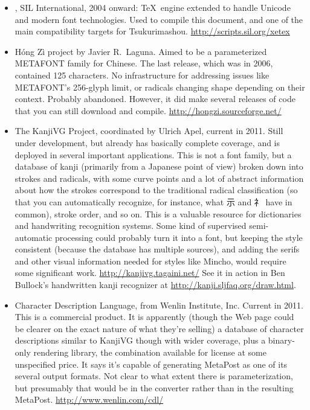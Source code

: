 \documentclass[14pt]{extarticle}
\begin{document}
\begin{itemize}
\item \XeTeX, SIL International, 2004 onward: \TeX\ engine extended to
handle Unicode and modern font technologies.  Used to compile this document,
and one of the main compatibility targets for Tsukurimashou.
\url{http://scripts.sil.org/xetex}

\item Hóng Zì project by Javier R.\ Laguna.  Aimed to be a parameterized
METAFONT family for Chinese.  The last release, which was in 2006,
contained 125 characters.  No infrastructure for addressing issues
like METAFONT's 256-glyph limit, or radicals changing shape depending
on their context.  Probably abandoned.  However, it did make several
releases of code that you can still download and compile.
\url{http://hongzi.sourceforge.net/}

\item The KanjiVG Project, coordinated by Ulrich Apel, current in 2011. 
Still under development, but already has basically complete coverage, and is
deployed in several important applications.  This is not a font family, but
a database of kanji (primarily from a Japanese point of view) broken down
into strokes and radicals, with some curve points and a lot of abstract
information about how the strokes correspond to the traditional radical
classification (so that you can automatically recognize, for instance, what
示 and 礻 have in common), stroke order, and so on.  This is a valuable
resource for dictionaries and handwriting recognition systems.  Some kind of
supervised semi-automatic processing could probably turn it into a font, but
keeping the style consistent (because the database has multiple sources),
and adding the serifs and other visual information needed for styles like
Mincho, would require some significant work. 
\url{http://kanjivg.tagaini.net/} See it in action in Ben Bullock's
handwritten kanji recognizer at \url{http://kanji.sljfaq.org/draw.html}.

\item Character Description Language, from Wenlin Institute, Inc.  Current
in 2011.  This is a commercial product.  It is apparently (though the
Web page could be clearer on the exact nature of what they're selling)
a database of character descriptions similar to KanjiVG though with
wider coverage, plus a binary-only rendering library, the combination
available for license at some unspecified price.  It says it's capable
of generating MetaPost as one of its several output formats.  Not
clear to what extent there is parameterization, but presumably that
would be in the converter rather than in the resulting MetaPost.
\url{http://www.wenlin.com/cdl/}


\end{itemize}
\end{document}

